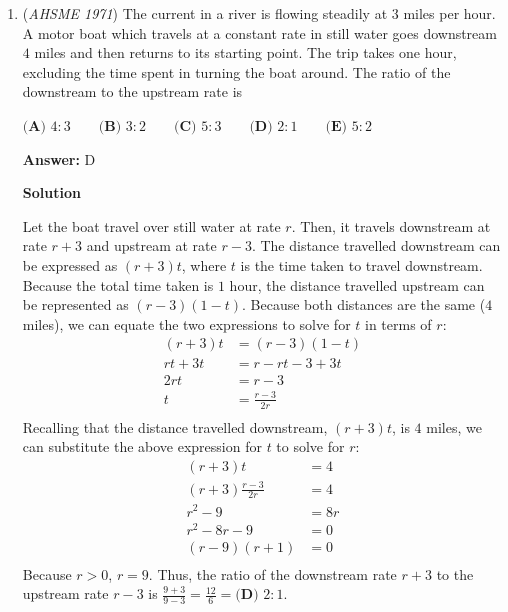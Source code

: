 \begin{enumerate}
 



\textbf{Solution 2}

We can draw the cases for small values of $n.$
 \[n = 0 \rightarrow \text{areas} = 1\]
 \[n = 1 \rightarrow \text{areas} = 4\]
 \[n = 2 \rightarrow \text{areas} = 7\]
 \[n = 3 \rightarrow \text{areas} = 10\]It seems that for $2n$ radii, there are $3n+1$ distinct areas. The secant line must pass through $n$ radii for this to occur.

 The answer is $\boxed{\textbf{(E) } 3n+1}.$

 -edited by coolmath34

 


	\item (\textit{AHSME 1971}) The current in a river is flowing steadily at $3$ miles per hour. A motor boat which travels at a constant rate in still 
water goes downstream $4$ miles and then returns to its starting point. The trip takes one hour, excluding the time spent 
in turning the boat around. The ratio of the downstream to the upstream rate is 


 $\textbf{(A) }4:3\qquad \textbf{(B) }3:2\qquad \textbf{(C) }5:3\qquad \textbf{(D) }2:1\qquad  \textbf{(E) }5:2$

 \textbf{Answer: }D



\textbf{Solution}

Let the boat travel over still water at rate $r$. Then, it travels downstream at rate $r+3$ and upstream at rate $r-3$. The distance travelled downstream can be expressed as $(r+3)t$, where $t$ is the time taken to travel downstream. Because the total time taken is $1$ hour, the distance travelled upstream can be represented as $(r-3)(1-t)$. Because both distances are the same ($4$ miles), we can equate the two expressions to solve for $t$ in terms of $r$:\begin{align*}(r+3)t &= (r-3)(1-t) \\rt+3t &= r-rt-3+3t \\2rt &= r-3 \\t &= \frac{r-3}{2r} \\\end{align*}
Recalling that the distance travelled downstream, $(r+3)t$, is $4$ miles, we can substitute the above expression for $t$ to solve for $r$:\begin{align*}(r+3)t &= 4 \\(r+3)\frac{r-3}{2r} &= 4 \\r^2-9 &= 8r \\r^2-8r-9 &= 0 \\(r-9)(r+1) &= 0 \\\end{align*}
Because $r>0$, $r=9$. Thus, the ratio of the downstream rate $r+3$ to the upstream rate $r-3$ is $\frac{9+3}{9-3}=\frac{12}6=\boxed{\textbf{(D) }2:1}$.


\end{enumerate}

